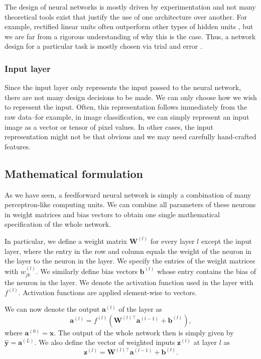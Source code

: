 The design of neural networks is mostly driven by experimentation and not many theoretical tools exist that justify the use of one architecture over another. For example, rectified linear units often outperform other types of hidden units \cite{DBLP:journals/jmlr/GlorotBB11 ,DBLP:conf/nips/KrizhevskySH12}, but we are far from a rigorous understanding of why this is the case. Thus, a network design for a particular task is mostly chosen via trial and error \cite[Ch.\,6,\,pp.\,185-187]{DBLP:books/daglib/0040158}.

\subsubsection{Input layer}
Since the input layer only represents the input passed to the neural network, there are not many design decisions to be made. We can only choose how we wish to represent the input. Often, this representation follows immediately from the raw data--for example, in image classification, we can simply represent an input image as a vector or tensor of pixel values. In other cases, the input representation might not be that obvious and we may need carefully hand-crafted features.

\subsection{Mathematical formulation}
As we have seen, a feedforward neural network is simply a combination of many perceptron-like computing units. We can combine all parameters of these neurons in weight matrices and bias vectors to obtain one single mathematical specification of the whole network.

In particular, we define a weight matrix $\bm{W}^{(l)}$ for every layer $l$ except the input layer, where the entry in the  row and  column equals the weight of the  neuron in the  layer to the  neuron in the  layer. We specify the entries of the weight matrices with $w_{jk}^{(l)}$. We similarly define bias vectors $\bm{b}^{(l)}$ whose  entry contains the bias of the  neuron in the  layer. We denote the activation function used in the  layer with $f^{(l)}$. Activation functions are applied element-wise to vectors.

We can now denote the output $\bm{a}^{(l)}$ of the  layer as
\begin{equation}
\bm{a}^{(l)} = f^{(l)}\left(\bm{W}^{(l)\top}\bm{a}^{(l-1)}+\bm{b}^{(l)}\right),
\end{equation}
where $\bm{a}^{(0)} = \bm{x}$. The output of the whole network then is simply given by $\hat{\bm{y}} = \bm{a}^{(L)}$. We also define the vector of weighted inputs $\bm{z}^{(l)}$ at layer $l$ as
\begin{equation}
\bm{z}^{(l)} = \bm{W}^{(l)\top}\bm{a}^{(l-1)}+\bm{b}^{(l)}.
\end{equation}

